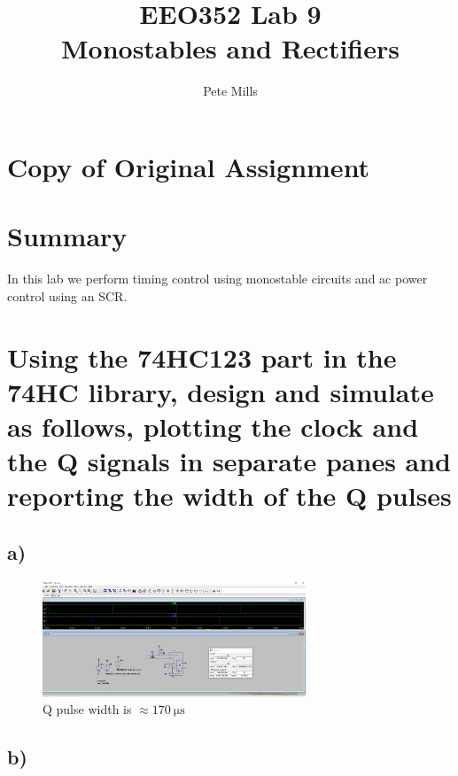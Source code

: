 \documentclass{article}
\begin{document}
	
	
	\title{EEO352 Lab 9\\ Monostables and Rectifiers}
	\author{Pete Mills}
	
	\maketitle
	
	\section*{Copy of Original Assignment}
	
	
	
	
	\section*{Summary}
	
	In this lab we perform timing control using monostable circuits and ac power control using an SCR.
	

	\section{Using the 74HC123 part in the 74HC library, design and simulate as follows, plotting the clock and the Q signals in separate panes and reporting the width of the Q pulses}
	
	\subsection*{a)}

	\begin{figure}[H]
	    \centering
	    \includegraphics[width=0.7\textwidth]{1a}
	    \caption{Q pulse width is $\approx \SI{170}{\micro\second}$}
	\end{figure}
	
	\subsection*{b)}
	
\end{document}
